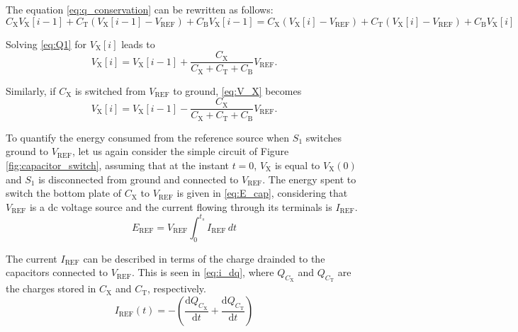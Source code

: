 \documentclass[]{article}
\newcommand{\figref}[1]{Figure \ref{#1}}
\newcommand{\vref}{\ensuremath{V_\mathrm{REF}}}
\newcommand{\iref}{\ensuremath{I_\mathrm{REF}}}
\newcommand{\eref}{\ensuremath{E_\mathrm{REF}}}
\begin{document}
The equation \eqref{eq:q_conservation} can be rewritten as follows:
\begin{equation}
	C_\mathrm{X} V_\mathrm{X}[i-1] + C_\mathrm{T} \left( V_\mathrm{X}[i-1] -\vref \right) + C_\mathrm{B} V_\mathrm{X}[i-1] = C_\mathrm{X} \left( V_\mathrm{X}[i] -\vref \right) + C_\mathrm{T} \left( V_\mathrm{X}[i] -\vref \right) + C_\mathrm{B} V_\mathrm{X}[i] 
	\label{eq:Q1}
\end{equation}

Solving \eqref{eq:Q1} for $V_\mathrm{X}[i]$ leads to
\begin{equation}
	V_\mathrm{X}[i] = V_\mathrm{X}[i-1]+\frac{C_\mathrm{X}}{C_\mathrm{X}+C_\mathrm{T}+C_\mathrm{B}}\vref.
	\label{eq:V_X}
\end{equation}

Similarly, if $C_\mathrm{X}$ is switched from $\vref$ to ground, \eqref{eq:V_X} becomes
\begin{equation}
	V_\mathrm{X}[i] = V_\mathrm{X}[i-1]-\frac{C_\mathrm{X}}{C_\mathrm{X}+C_\mathrm{T}+C_\mathrm{B}}\vref.
	\label{eq:V_Xgnd}
\end{equation}


To quantify the energy consumed from the reference source when $S_1$ switches ground to $\vref$, let us again consider the simple circuit of  \figref{fig:capacitor_switch}, assuming that at the instant $t=0$, $V_\mathrm{X}$ is equal to $V_\mathrm{X}(0)$ and $S_1$ is disconnected from ground and connected to $\vref$. The energy spent to switch the bottom plate of $C_\mathrm{X}$ to $\vref$ is given in \eqref{eq:E_cap}, considering that $\vref$ is a dc voltage source and the current flowing through its terminals is $\iref$.
\begin{equation}
	\eref=\vref \int_0^{t_s} \iref \mathrm \, {d}t
	\label{eq:E_cap}
\end{equation}

The current $\iref$ can be described in terms of the charge drainded to the capacitors connected to $\vref$. This is seen in \eqref{eq:i_dq}, where $Q_{C_\mathrm{X}}$ and $Q_{C_\mathrm{T}}$ are the charges stored in $C_\mathrm{X}$ and $C_\mathrm{T}$, respectively.
\begin{equation}
	\iref(t)=-\left(\frac{\mathrm{d}Q_{C_\mathrm{X}}}{\mathrm{d}t}+\frac{\mathrm{d}Q_{C_\mathrm{T}}}{\mathrm{d}t}\right)
	\label{eq:i_dq}
\end{equation}
\end{document}

